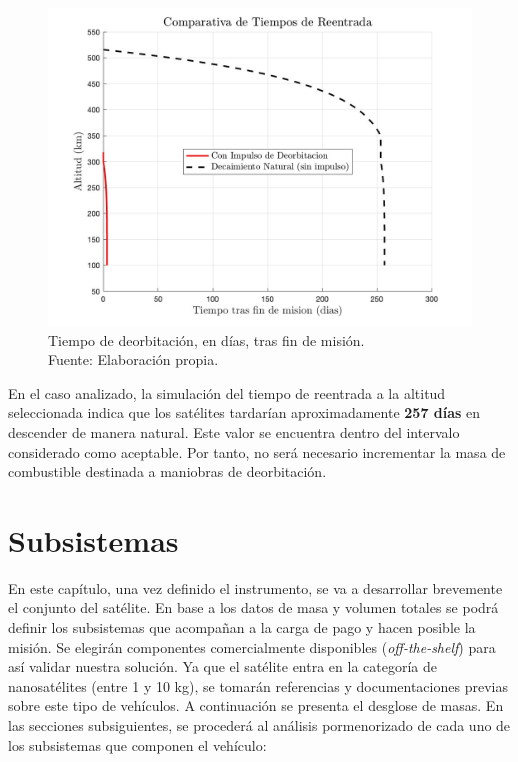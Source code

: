 \begin{figure}[H]
    \centering
    \includegraphics[width=1\linewidth]{5.Mission/deorbit.jpg}
    \caption{Tiempo de deorbitación, en días, tras fin de misión. \\Fuente: Elaboración propia.}
\end{figure}

En el caso analizado, la simulación del tiempo de reentrada a la altitud seleccionada indica que los satélites tardarían aproximadamente \textbf{257 días} en descender de manera natural. Este valor se encuentra dentro del intervalo considerado como aceptable. Por tanto, no será necesario incrementar la masa de combustible destinada a maniobras de deorbitación.


\chapter{Subsistemas}

En este capítulo, una vez definido el instrumento, se va a desarrollar brevemente el conjunto del satélite. En base a los datos de masa y volumen totales se podrá definir los subsistemas que acompañan a la carga de pago y hacen posible la misión. Se elegirán componentes comercialmente disponibles (\textit{off-the-shelf}) para así validar nuestra solución. Ya que el satélite entra en la categoría de nanosatélites (entre 1 y 10 kg), se tomarán referencias y documentaciones previas sobre este tipo de vehículos. A continuación se presenta el desglose de masas. En las secciones subsiguientes, se procederá al análisis pormenorizado de cada uno de los subsistemas que componen el vehículo: 

